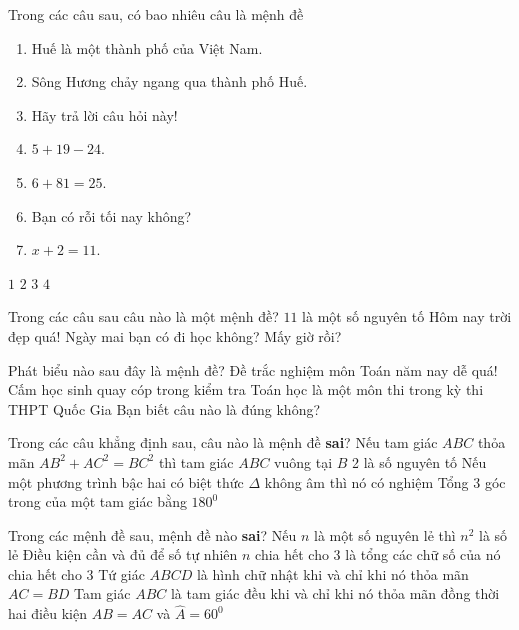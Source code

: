 \begin{ex}%
	Trong các câu sau, có bao nhiêu câu là mệnh đề
	\begin{enumerate}
		\item Huế là một thành phố của Việt Nam.
		\item Sông Hương chảy ngang qua thành phố Huế.
		\item Hãy trả lời câu hỏi này!
		\item $5+19-24$.
		\item $6+81=25$.
		\item Bạn có rỗi tối nay không?
		\item $x+2=11$.
	\end{enumerate}
	\choice
	{$1$}
	{$2$}
	{\True $3$}
	{$4$}
\end{ex}
\begin{ex}%
	Trong các câu sau câu nào là một mệnh đề?
	\choice
	{\True $11$ là một số nguyên tố}
	{Hôm nay trời đẹp quá!}
	{Ngày mai bạn có đi học không?}
	{Mấy giờ rồi?}
\end{ex}
\begin{ex}%
	Phát biểu nào sau đây là mệnh đề?
	\choice
	{Đề trắc nghiệm môn Toán năm nay dễ quá!}
	{Cấm học sinh quay cóp trong kiểm tra}
	{\True Toán học là một môn thi trong kỳ thi THPT Quốc Gia}
	{Bạn biết câu nào là đúng không?}
\end{ex}

\begin{ex}%
Trong các câu khẳng định sau, câu nào là mệnh đề \textbf{sai}?
\choice
{\True Nếu tam giác $ABC$ thỏa mãn $AB^2+AC^2=BC^2$ thì tam giác $ABC$ vuông tại $B$}
{2 là số nguyên tố}
{Nếu một phương trình bậc hai có biệt thức $\Delta$ không âm thì nó có nghiệm}
{Tổng $3$ góc trong của một tam giác bằng $180^0$} 
\end{ex}
\begin{ex}%
Trong các mệnh đề sau, mệnh đề nào \textbf{sai}?
\choice
{Nếu $n$ là một số nguyên lẻ thì $n^2$ là số lẻ}
{Điều kiện cần và đủ để số tự nhiên $n$ chia hết cho 3 là tổng các chữ số của nó chia hết cho $3$}
{\True Tứ giác $ABCD$ là hình chữ nhật khi và chỉ khi nó thỏa mãn $AC=BD$}
{Tam giác $ABC$ là tam giác đều khi và chỉ khi nó thỏa mãn đồng thời hai điều kiện $AB=AC$ và $\widehat{A}=60^0$} 
\end{ex}

